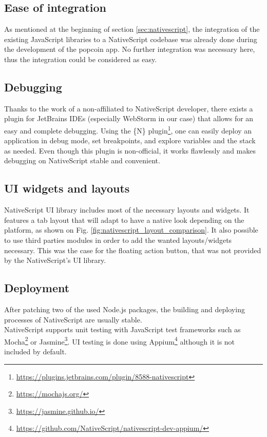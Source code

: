 \documentclass[11pt, a4paper, twoside, openright]{article} %
\begin{document}
{\subsection{Ease of integration}
As mentioned at the beginning of section \ref{sec:nativescript}, the integration of the existing JavaScript libraries to a NativeScript codebase was already done during the development of the popcoin app. No further integration was necessary here, thus the integration could be considered as easy.

\subsection{Debugging}
Thanks to the work of a non-affiliated to NativeScript developer, there exists a plugin for JetBrains IDEs (especially WebStorm in our case) that allows for an easy and complete debugging. Using the \{N\} plugin\footnote{\url{https://plugins.jetbrains.com/plugin/8588-nativescript}}, one can easily deploy an application in debug mode, set breakpoints, and explore variables and the stack as needed. Even though this plugin is non-official, it works flawlessly and makes debugging on NativeScript stable and convenient.

\subsection{UI widgets and layouts}
NativeScript UI library includes most of the necessary layouts and widgets. It features a tab layout that will adapt to have a native look depending on the platform, as shown on Fig. \ref{fig:nativescript_layout_comparison}.
It also possible to use third parties modules in order to add the wanted layouts/widgets necessary. This was the case for the floating action button, that was not provided by the NativeScript's UI library. 

\subsection{Deployment}
After patching two of the used Node.js packages, the building and deploying processes of NativeScript are usually stable.\\

NativeScript supports unit testing with JavaScript test frameworks such as Mocha\footnote{\url{https://mochajs.org/}} or Jasmine\footnote{\url{https://jasmine.github.io/}}. UI testing is done using Appium\footnote{\url{https://github.com/NativeScript/nativescript-dev-appium/}} although it is not included by default.\\

}
\end{document}
